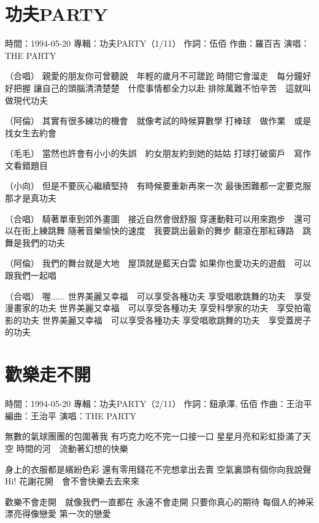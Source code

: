 \documentclass[UTF8,a4paper,oneside,twocolumn,12pt]{ctexbook}
\newcommand{\infopair}[2]{\textbullet #1：#2}
\newcommand{\zc}[1][伍佰]{\infopair{作詞}{#1}}
\newcommand{\zq}[1][伍佰]{\infopair{作曲}{#1}}
\newcommand{\bq}[1][伍佰]{\infopair{編曲}{#1}}
\newcommand{\zj}[1]{\infopair{專輯}{#1}}
\newcommand{\sj}[1]{\infopair{時間}{#1}}
\newenvironment{info}{\begin{flushleft}\kaishu
	}
	{\end{flushleft}\normalsize\yahei\par}
\newenvironment{lyric}{
	}
{}
\begin{document}
\section{功夫PARTY}
\begin{info}
	\sj{1994-05-20}
	\zj{功夫PARTY（1/11）}
	\zc
	\zq[羅百吉]
	\infopair{演唱}{THE PARTY}
\end{info}
\begin{lyric}
	（合唱）
	親愛的朋友你可曾聽說　年輕的歲月不可蹉跎
	時間它會溜走　每分鐘好好把握
	讓自己的頭腦清清楚楚　什麼事情都全力以赴
	排除萬難不怕辛苦　這就叫做現代功夫

	（阿倫）
	其實有很多練功的機會　就像考試的時候算數學
	打棒球　做作業　或是找女生去約會

	（毛毛）
	當然也許會有小小的失誤　約女朋友約到她的姑姑
	打球打破窗戶　寫作文看錯題目

	（小向）
	但是不要灰心繼續堅持　有時候要重新再來一次
	最後困難都一定要克服　那才是真功夫

	（合唱）
	騎著單車到郊外畫圖　接近自然會很舒服
	穿運動鞋可以用來跑步　還可以在街上練跳舞
	隨著音樂愉快的速度　我要跳出最新的舞步
	翻滾在那紅磚路　跳舞是我們的功夫

	（阿倫）
	我們的舞台就是大地　屋頂就是藍天白雲
	如果你也愛功夫的遊戲　可以跟我們一起唱

	（合唱）
	喔......
	世界美麗又幸福　可以享受各種功夫
	享受唱歌跳舞的功夫　享受漫畫家的功夫
	世界美麗又幸福　可以享受各種功夫
	享受科學家的功夫　享受拍電影的功夫
	世界美麗又幸福　可以享受各種功夫
	享受唱歌跳舞的功夫　享受蓋房子的功夫
\end{lyric}

\section{歡樂走不開}
\begin{info}
	\sj{1994-05-20}
	\zj{功夫PARTY（2/11）}
	\zc[鈕承澤, 伍佰]
	\zq[王治平]
	\bq[王治平]
	\infopair{演唱}{THE PARTY}
\end{info}
\begin{lyric}
	無數的氣球團團的包圍著我
	有巧克力吃不完一口接一口
	星星月亮和彩虹掛滿了天空
	時間的河　流動著幻想的快樂

	身上的衣服都是繽紛色彩
	還有零用錢花不完想拿出去賣
	空氣裏頭有個你向我說聲Hi!
	花謝花開　會不會快樂去去來來

	歡樂不會走開　就像我們一直都在
	永遠不會走開 只要你真心的期待
	每個人的神采 漂亮得像戀愛 第一次的戀愛
\end{lyric}
\end{document}
